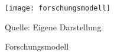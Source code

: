 \begin{figure}[H]
	\centering
	\caption{Forschungsmodell}
	\texttt{[image: forschungsmodell]}
	\label{fig:forschungsmodell}
	\vspace{-1.0em}
	\begin{flushleft}
		\small{Quelle: Eigene Darstellung}
	\end{flushleft}
\end{figure}









